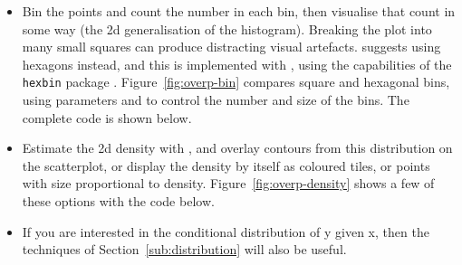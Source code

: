 \begin{itemize}
  \item Bin the points and count the number in each bin, then visualise that count in some way (the 2d generalisation of the histogram).  Breaking the plot into many small squares can produce distracting visual artefacts.  \citet{carr:1987} suggests using hexagons instead, and this is implemented with , using the capabilities of the {\tt hexbin} package \citep{hexbin}.  Figure~\ref{fig:overp-bin} compares square and hexagonal bins, using parameters  and  to control the number and size of the bins.  The complete code is shown below.       
  
    
  
  \item Estimate the 2d density with , and overlay contours from this distribution on the scatterplot, or display the density by itself as coloured tiles, or points with size proportional to density.  Figure~\ref{fig:overp-density} shows a few of these options with the code below.    
  
    
  
  \item If you are interested in the conditional distribution of y given x, then the techniques of Section~\ref{sub:distribution} will also be useful.
  
\end{itemize}

